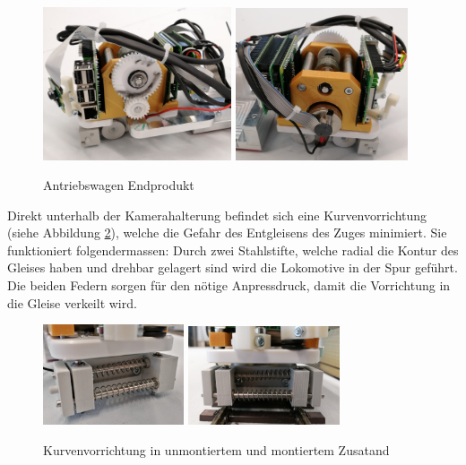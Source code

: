 \documentclass[../../main.tex]{subfiles}
\begin{document}
\begin{figure}[H]
    \centering
    \includegraphics[width=0.495\textwidth]{../../images/Maschinentechnik/antriebswagen3.PNG}
    \includegraphics[width=0.455\textwidth]{../../images/Maschinentechnik/antriebswagen4.PNG}
    \caption {Antriebswagen Endprodukt}
    \label{fig:antriebswagen2}
\end{figure}

Direkt unterhalb der Kamerahalterung befindet sich eine Kurvenvorrichtung (siehe Abbildung \ref{fig:kurvenvorrichtung}), welche die Gefahr des Entgleisens des Zuges minimiert. Sie funktioniert folgendermassen: Durch zwei Stahlstifte, welche radial die Kontur des Gleises haben und drehbar gelagert sind wird die Lokomotive in der Spur geführt. Die beiden Federn sorgen für den nötige Anpressdruck, damit die Vorrichtung in die Gleise verkeilt wird.\\

\begin{figure}[H]
  \centering
  \includegraphics[width=0.37\textwidth]{../../images/Maschinentechnik/kurvenvorrichtung.PNG}
  \includegraphics[width=0.4\textwidth]{../../images/Maschinentechnik/testkurvenvorrichtung2.PNG}
  \caption {Kurvenvorrichtung in unmontiertem und montiertem Zusatand}
  \label{fig:kurvenvorrichtung}
\end{figure}
\end{document}
